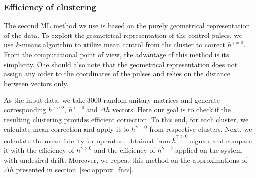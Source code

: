 \documentclass[aps,pra,showkeys,showpacs,notitlepage,superscriptaddress]{revtex4-1}
\newcommand{\1}{{\rm 1\hspace{-0.9mm}l}}
\newcommand{\NCP}{\ensuremath{h^{\gamma=0}}\xspace}
\newcommand{\DCP}{\ensuremath{h^{\gamma >0}}\xspace}
\newcommand{\CCP}{\ensuremath{\Delta h}\xspace}
\newcommand{\nnDCP}{\ensuremath{\tilde{h}^{\gamma >0}}\xspace}
\begin{document}
\subsubsection{Efficiency of clustering}
The second ML method we use is based on the purely geometrical representation of the data. To exploit the geometrical representation of the control pulses, we use $k$-means algorithm to utilize mean control from the cluster to correct \NCP.  From the computational point of view, the advantage of this method is its simplicity. One should also note that the geometrical representation does not assign any order to the coordinates of the pulses and relies on the distance between vectors only.

As the input data, we take 3000 random unitary matrices and generate corresponding \DCP, \NCP and \CCP vectors. Here our goal is to check if the resulting clustering provides efficient correction. To this end, for each cluster, we calculate mean correction and apply it to \NCP from respective clusters. Next, we calculate the mean fidelity for operators obtained from
\nnDCP signals and compare it with the efficiency of \DCP and the efficiency of \NCP applied on the system with undesired drift. Moreover, we repeat this method on the approximations of \CCP presented in section~\ref{sec:approx_fncs}.

\end{document}
